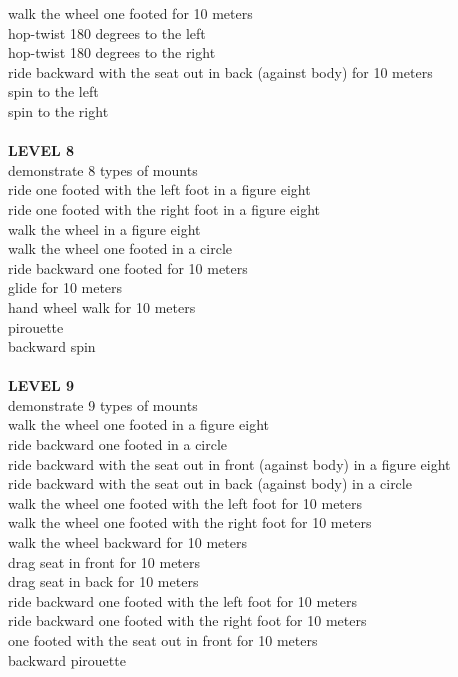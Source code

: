 walk the wheel one footed for 10 meters\\
hop-twist 180 degrees to the left\\
hop-twist 180 degrees to the right\\
ride backward with the seat out in back (against body) for 10 meters\\
spin to the left\\
spin to the right\\\\
\textbf{LEVEL 8}\\
demonstrate 8 types of mounts\\
ride one footed with the left foot in a figure eight\\
ride one footed with the right foot in a figure eight\\
walk the wheel in a figure eight\\
walk the wheel one footed in a circle\\
ride backward one footed for 10 meters\\
glide for 10 meters\\
hand wheel walk for 10 meters\\
pirouette\\
backward spin\\\\
\textbf{LEVEL 9}\\
demonstrate 9 types of mounts\\
walk the wheel one footed in a figure eight\\
ride backward one footed in a circle\\
ride backward with the seat out in front (against body) in a figure eight\\
ride backward with the seat out in back (against body) in a circle\\
walk the wheel one footed with the left foot for 10 meters\\
walk the wheel one footed with the right foot for 10 meters\\
walk the wheel backward for 10 meters\\
drag seat in front for 10 meters\\
drag seat in back for 10 meters\\
ride backward one footed with the left foot for 10 meters\\
ride backward one footed with the right foot for 10 meters\\
one footed with the seat out in front for 10 meters\\
backward pirouette\\\\
